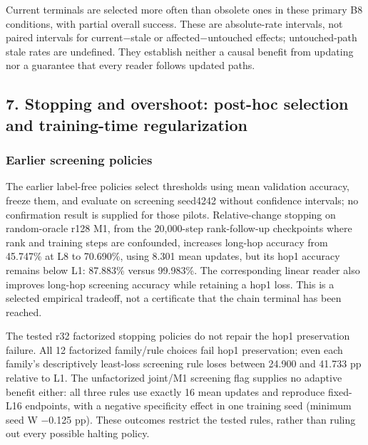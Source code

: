 Current terminals are selected more often than obsolete ones in these primary B8
conditions, with partial overall success. These are absolute-rate  %
intervals, not paired intervals for current\ensuremath{-}stale or affected\ensuremath{-}untouched effects;
untouched-path stale rates are undefined. They establish neither a  %
causal benefit from updating nor a guarantee that every reader follows updated paths.


\subsection*{7. Stopping and overshoot: post-hoc selection and training-time regularization}

\subsubsection*{Earlier screening policies}

The earlier label-free policies select thresholds using mean validation accuracy, freeze them,
and evaluate on screening seed4242 without confidence intervals; no confirmation
result is supplied for those pilots. Relative-change stopping on random-oracle  %
r128 M1, from the 20,000-step rank-follow-up checkpoints where rank and training steps
are confounded, increases long-hop accuracy from 45.747\% at L8 to 70.690\%, using 8.301 mean
updates, but its hop1 accuracy remains below L1: 87.883\% versus 99.983\%.  %
The corresponding linear reader also improves long-hop screening accuracy while
retaining a hop1 loss. This is a selected empirical tradeoff, not a  %
certificate that the chain terminal has been reached.  %

The tested r32 factorized stopping policies do not repair the hop1 preservation
failure. All 12 factorized  %
family/\allowbreak{}rule choices fail hop1 preservation; even each family’s descriptively
least-loss screening rule loses between 24.900 and 41.733 pp relative to L1.
 The unfactorized joint/\allowbreak{}M1 screening flag supplies no adaptive benefit  %
either: all three rules use exactly 16 mean updates and reproduce fixed-L16
endpoints, with a negative specificity effect in one training seed (minimum seed W
\ensuremath{-}0.125 pp).  %
These outcomes restrict the tested rules, rather than ruling out every possible
halting policy.  %

